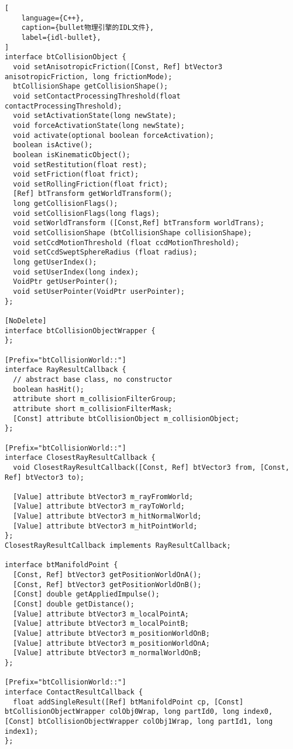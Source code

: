 \begin{lstlisting}[
    language={C++},
    caption={bullet物理引擎的IDL文件},
    label={idl-bullet},
]
interface btCollisionObject {
  void setAnisotropicFriction([Const, Ref] btVector3 anisotropicFriction, long frictionMode);
  btCollisionShape getCollisionShape();
  void setContactProcessingThreshold(float contactProcessingThreshold);
  void setActivationState(long newState);
  void forceActivationState(long newState);
  void activate(optional boolean forceActivation);
  boolean isActive();
  boolean isKinematicObject();
  void setRestitution(float rest);
  void setFriction(float frict);
  void setRollingFriction(float frict);
  [Ref] btTransform getWorldTransform();
  long getCollisionFlags();
  void setCollisionFlags(long flags);
  void setWorldTransform ([Const,Ref] btTransform worldTrans);
  void setCollisionShape (btCollisionShape collisionShape);
  void setCcdMotionThreshold (float ccdMotionThreshold);
  void setCcdSweptSphereRadius (float radius);
  long getUserIndex();
  void setUserIndex(long index);
  VoidPtr getUserPointer();
  void setUserPointer(VoidPtr userPointer);
};

[NoDelete]
interface btCollisionObjectWrapper {
};

[Prefix="btCollisionWorld::"]
interface RayResultCallback {
  // abstract base class, no constructor
  boolean hasHit();
  attribute short m_collisionFilterGroup;
  attribute short m_collisionFilterMask;
  [Const] attribute btCollisionObject m_collisionObject;
};

[Prefix="btCollisionWorld::"]
interface ClosestRayResultCallback {
  void ClosestRayResultCallback([Const, Ref] btVector3 from, [Const, Ref] btVector3 to);

  [Value] attribute btVector3 m_rayFromWorld;
  [Value] attribute btVector3 m_rayToWorld;
  [Value] attribute btVector3 m_hitNormalWorld;
  [Value] attribute btVector3 m_hitPointWorld;
};
ClosestRayResultCallback implements RayResultCallback;

interface btManifoldPoint {
  [Const, Ref] btVector3 getPositionWorldOnA();
  [Const, Ref] btVector3 getPositionWorldOnB();
  [Const] double getAppliedImpulse();
  [Const] double getDistance();
  [Value] attribute btVector3 m_localPointA;
  [Value] attribute btVector3 m_localPointB;
  [Value] attribute btVector3 m_positionWorldOnB;
  [Value] attribute btVector3 m_positionWorldOnA;
  [Value] attribute btVector3 m_normalWorldOnB;
};

[Prefix="btCollisionWorld::"]
interface ContactResultCallback {
  float addSingleResult([Ref] btManifoldPoint cp, [Const] btCollisionObjectWrapper colObj0Wrap, long partId0, long index0, [Const] btCollisionObjectWrapper colObj1Wrap, long partId1, long index1);
};


\end{lstlisting}
